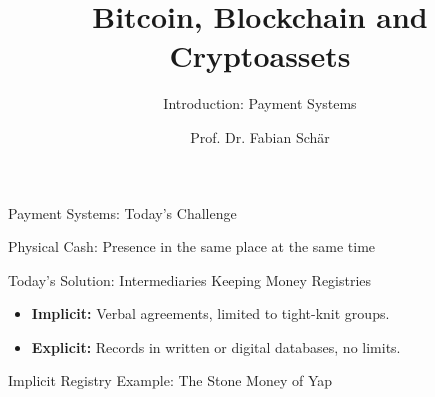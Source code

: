 \documentclass[]{beamer}
\title{Bitcoin, Blockchain and Cryptoassets}
\subtitle{Introduction: Payment Systems}
\author{Prof. Dr. Fabian Schär}
\institute{University of Basel}
\begin{document}
\thispagestyle{empty}
\begin{frame}[noframenumbering]
	\titlepage
\end{frame}

\begin{frame}{Payment Systems: Today's Challenge}

Physical Cash: Presence in the same place at the same time
\begin{figure}[h]
	\center
		
\end{figure}

\vspace{1.5 em}

	
\end{frame}

\begin{frame}{Today's Solution: Intermediaries Keeping Money Registries}

\begin{figure}[h]
	\center
		
\end{figure}
\vspace{1.5em}
\begin{itemize}
	\item<7-> \textbf{Implicit:} Verbal agreements, limited to tight-knit groups.
	\item<8-> \textbf{Explicit:} Records in written or digital databases, no limits.
\end{itemize}
	
\end{frame}

\begin{frame}{Implicit Registry Example: The Stone Money of Yap}

\begin{figure}[h]
	\center
		
\end{figure}
	
\end{frame}
\end{document}

